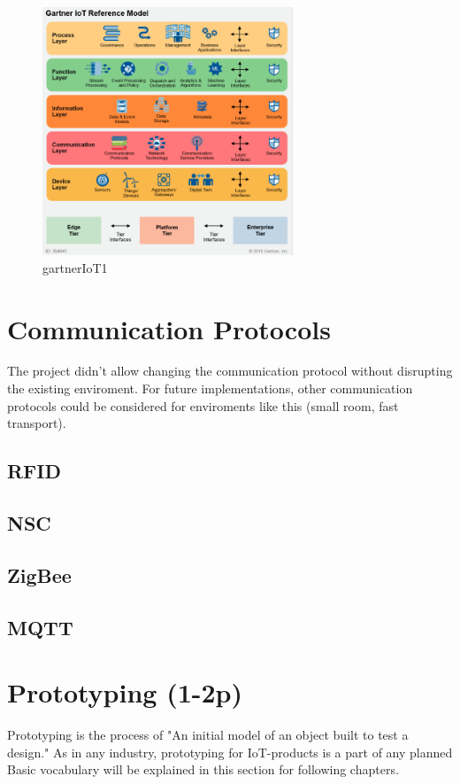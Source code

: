 \begin{figure}[th]
	\centering
	\includegraphics[width=75mm,scale=0.75]{Figures/gartnerIoT}
	\decoRule
	\caption[Gartner]{gartnerIoT1}
	\label{fig:gartnerIoT}
\end{figure}
\section{Communication Protocols}
The project didn't allow changing the communication protocol without disrupting the existing enviroment. 
For future implementations, other communication protocols could be considered for enviroments like this (small room, fast transport).
\subsection{RFID}
\subsection{NSC}
\subsection{ZigBee}
\subsection{MQTT}
\section{Prototyping (1-2p)}
Prototyping is the process of "An initial model of an object built to test a design." \parencite{prototypeDef}
As in any industry, prototyping for IoT-products is a part of any planned 
Basic vocabulary will be explained in this section for following chapters.

